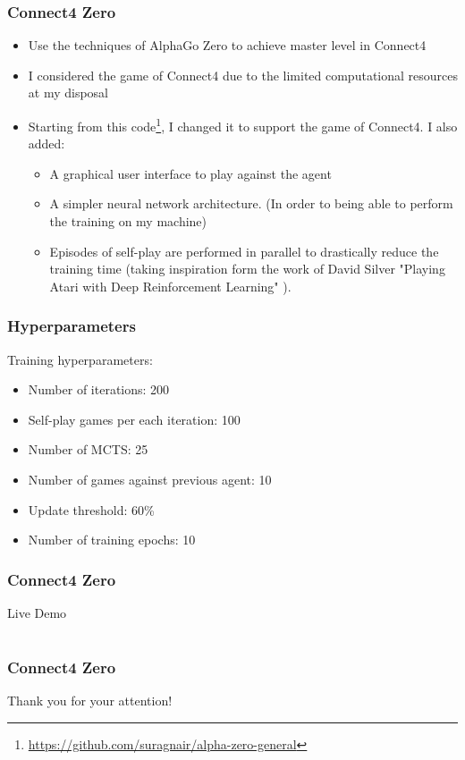 \documentclass[9pt]{beamer}
\begin{document}
\begin{frame}
	\frametitle{Connect4 Zero}

	\begin{itemize}
		\item Use the techniques of AlphaGo Zero \cite{silver2017mastering} to achieve master level in Connect4
		\item I considered the game of Connect4 due to the limited computational resources at my disposal
		\item Starting from this code\footnote{\url{https://github.com/suragnair/alpha-zero-general}}, I changed it to support the game of Connect4. I also added:
		\begin{itemize}
			\item A graphical user interface to play against the agent
			\item A simpler neural network architecture. (In order to being able to perform the training on my machine)
			\item Episodes of self-play are performed in parallel to drastically reduce the training time (taking inspiration form the work of David Silver "Playing Atari with Deep Reinforcement Learning" \cite{mnih2013atari}).

		\end{itemize}

	\end{itemize}

\end{frame}


\begin{frame}
	\frametitle{Hyperparameters}
	Training hyperparameters:

	\begin{itemize}
		\item Number of iterations: 200
		\item Self-play games per each iteration: 100
		\item Number of MCTS: 25
		\item Number of games against previous agent: 10
		\item Update threshold: 60\%
		\item Number of training epochs: 10
	\end{itemize}

\end{frame}


\begin{frame}
	\frametitle{Connect4 Zero}
	\Huge{\centerline{Live Demo}}
\end{frame}

\section{}
\begin{frame}
	\frametitle{Connect4 Zero}
	\Huge{\centerline{Thank you for your attention!}}
\end{frame}

\end{document}
